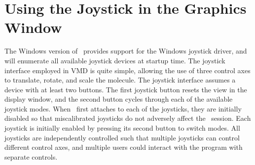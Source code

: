 %
%
%

\section{Using the Joystick in the Graphics Window}
\label{ug:joystick}

The Windows version of \VMD\ provides support for the 
Windows joystick driver, and will enumerate all available joystick
devices at startup time.  The joystick interface employed in VMD 
is quite simple, allowing the use of three control axes to translate,
rotate, and scale the molecule.  The joystick interface assumes a 
device with at least two buttons.  The first joystick button resets
the view in the display window, and the second button cycles through 
each of the available joystick modes.  When \VMD\ first attaches to
each of the joysticks, they are initially disabled so that miscalibrated
joysticks do not adversely affect the \VMD\ session.  Each joystick is
initially enabled by pressing its second button to switch modes.  All
joysticks are independently controlled such that multiple joysticks can
control different control axes, and multiple users could interact 
with the program with separate controls.

\newpage

